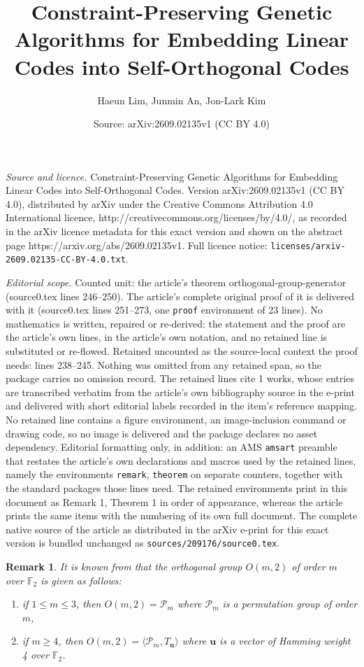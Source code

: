 \documentclass[10pt,a4paper]{amsart}
\title{Constraint-Preserving Genetic Algorithms for Embedding Linear Codes into Self-Orthogonal Codes}
\author{Haeun Lim, Junmin An, Jon-Lark Kim}
\date{Source: arXiv:2609.02135v1 (CC BY 4.0)}
\newtheorem{remark}{Remark}
\begin{document}
\maketitle

\noindent\emph{Source and licence.} Constraint-Preserving Genetic Algorithms for Embedding Linear Codes into Self-Orthogonal Codes. Version arXiv:2609.02135v1 (CC BY 4.0), distributed by arXiv under the Creative Commons Attribution 4.0 International licence, http://creativecommons.org/licenses/by/4.0/, as recorded in the arXiv licence metadata for this exact version and shown on the abstract page https://arxiv.org/abs/2609.02135v1. Full licence notice: \texttt{licenses/arxiv-2609.02135-CC-BY-4.0.txt}.\par\smallskip

\noindent\textit{Editorial scope.} Counted unit: the article's theorem orthogonal-group-generator (source0.tex lines 246--250). The article's complete original proof of it is delivered with it (source0.tex lines 251--273, one \texttt{proof} environment of 23 lines). No mathematics is written, repaired or re-derived: the statement and the proof are the article's own lines, in the article's own notation, and no retained line is substituted or re-flowed.  Retained uncounted as the source-local context the proof needs: lines 238--245.  Nothing was omitted from any retained span, so the package carries no omission record.  The retained lines cite 1 works, whose entries are transcribed verbatim from the article's own bibliography source in the e-print and delivered with short editorial labels recorded in the item's reference mapping.  No retained line contains a figure environment, an image-inclusion command or drawing code, so no image is delivered and the package declares no asset dependency.  Editorial formatting only, in addition: an AMS \texttt{amsart} preamble that restates the article's own declarations and macros used by the retained lines, namely the environments \texttt{remark}, \texttt{theorem} on separate counters, together with the standard packages those lines need.  The retained environments print in this document as Remark 1, Theorem 1 in order of appearance, whereas the article prints the same items with the numbering of its own full document.  The complete native source of the article as distributed in the arXiv e-print for this exact version is bundled unchanged as \texttt{sources/209176/source0.tex}.
\begin{remark}\label{orthogonal-group}
    It is known from \cite{Parametrization} that the orthogonal group $O(m,2)$ of order $m$ over $\mathbb{F}_2$ is given as follows:
    \begin{enumerate}
    \item if $1 \leq m \leq 3$, then $O(m,2) = \mathcal{P}_m$ where $\mathcal{P}_m$ is a permutation group of order $m$,
    \item if $m \geq 4$, then $O(m,2)=\langle\mathcal{P}_m, T_{\mathbf{u}}\rangle$
    where $\mathbf{u}$ is a vector of Hamming weight 4 over $\mathbb{F}_2$.
    \end{enumerate}
\end{remark}
\end{document}

